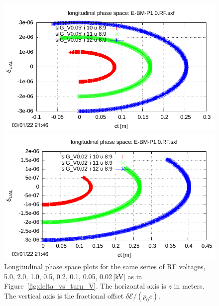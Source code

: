 \documentclass[]{article}
\begin{document}
\begin{figure}[h]
\begin{minipage}[b]{0.45\linewidth}
\end{minipage}
%
%
\begin{minipage}[b]{0.45\linewidth}
\centering
\includegraphics[scale=0.6]{pdf/delta_vs_ct_V0p05.pdf}
\end{minipage}
%
\hskip 1.5cm
%
\begin{minipage}[b]{0.45\linewidth}
\centering
\includegraphics[scale=0.6]{pdf/delta_vs_ct_V0p02.pdf}
\end{minipage}
%
\caption{\label{fig:delta_vs_ct_V}
Longitudinal phase space plots for the same series of RF voltages,
5.0, 2.0, 1.0, 0.5, 0.2, 0.1, 0.05, 0.02\,[kV] as in 
Figure~\ref{fig:delta_vs_turn_V}. The horizontal axis is $z$ in meters.
The vertical axis is the fractional offset 
$\delta{\mathcal{E}}/(p_0c)$.
}
\end{figure}
%
\end{document}
